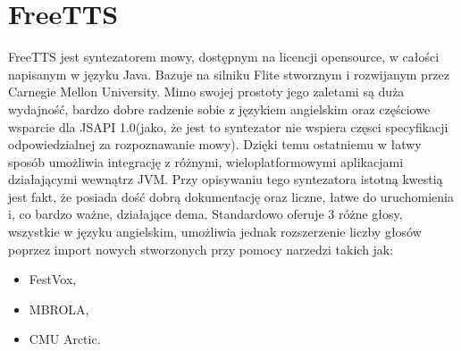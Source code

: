 \section{FreeTTS}
FreeTTS jest syntezatorem mowy, dostępnym na licencji opensource, w całości napisanym w języku Java. Bazuje na silniku Flite stworznym i rozwijanym przez Carnegie Mellon University. Mimo swojej prostoty jego zaletami są duża wydajność, bardzo dobre radzenie sobie z językiem angielskim oraz częściowe wsparcie dla JSAPI 1.0(jako, że jest to syntezator nie wspiera częsci specyfikacji odpowiedzialnej za rozpoznawanie mowy). Dzięki temu ostatniemu w łatwy sposób umożliwia integrację z różnymi, wieloplatformowymi aplikacjami działającymi wewnątrz JVM. Przy opisywaniu tego syntezatora istotną kwestią jest fakt, że posiada dość dobrą dokumentację oraz liczne, łatwe do uruchomienia i, co bardzo ważne, działające dema. Standardowo oferuje 3 różne głosy, wszystkie w języku angielskim, umożliwia jednak rozszerzenie liczby głosów poprzez import nowych stworzonych przy pomocy narzedzi takich jak:
\begin{itemize}
	\item FestVox,
	\item MBROLA,
	\item CMU Arctic.
\end{itemize}    

